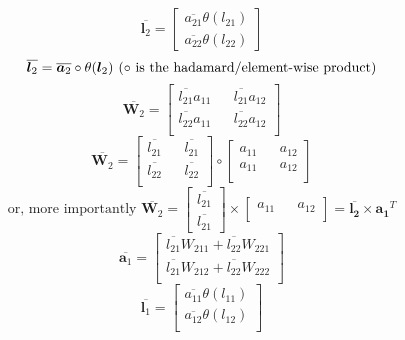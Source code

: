 \documentclass{article}
\begin{document}
\[\overline{\bm{l}_2} = \begin{bmatrix}
   \overline{a_{21}} \theta(l_{21}) \\ \overline{a_{22}} \theta(l_{22})
\end{bmatrix}\]
\begin{equation}
  \overline{\bm{l}_2} = \overline{\bm{a}_2} \circ \theta(\bm{l}_2) \hspace*{0.125cm}(\circ \text{ is the hadamard/element-wise product})
\end{equation}
\[
    \overline{\bm{W}_{2}} = \begin{bmatrix}
        \overline{l_{21}}a_{11} && \overline{l_{21}}a_{12}\\
        \overline{l_{22}}a_{11} && \overline{l_{22}}a_{12}\\
    \end{bmatrix}
\]
\[
    \overline{\bm{W}_{2}} = \begin{bmatrix}
        \overline{l_{21}} && \overline{l_{21}}\\
        \overline{l_{22}} && \overline{l_{22}}\\
    \end{bmatrix} \circ 
    \begin{bmatrix}
        a_{11} && a_{12}\\
        a_{11} && a_{12}\\
    \end{bmatrix}
\]
\begin{equation}
    \text{or, more importantly   }
    \overline{\bm{W}_{2}} = \begin{bmatrix}
        \overline{l_{21}} \\ \overline{l_{21}}
    \end{bmatrix} \times
    \begin{bmatrix}
        a_{11} && a_{12}\\
    \end{bmatrix}
    = \overline{\bm{l_{2}}} \times \bm{a_{1}}^T
\end{equation}
\begin{equation}
    \overline{\bm{a}_{1}} = \begin{bmatrix}
       \overline{l_{21}} W_{211} + \overline{l_{22}}W_{221} \\ 
       \overline{l_{21}} W_{212} + \overline{l_{22}}W_{222} \\ 
    \end{bmatrix} 
\end{equation}
\begin{equation}
    \overline{\bm{l}_{1}} = \begin{bmatrix}
        \overline{a_{11}} \theta(l_{11}) \\
        \overline{a_{12}} \theta(l_{12}) \\
    \end{bmatrix}
\end{equation}
\end{document}
